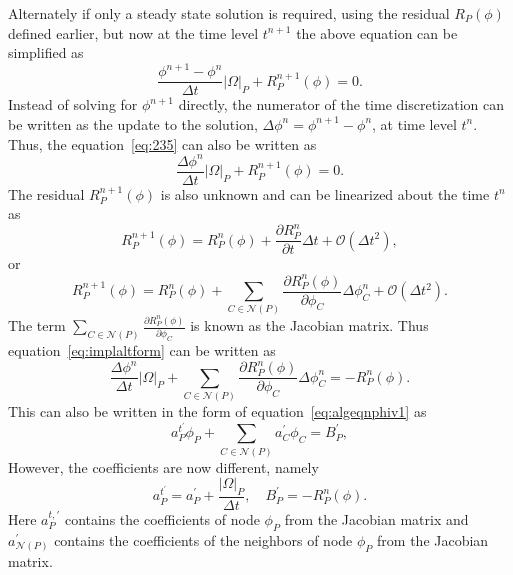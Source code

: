 Alternately if only a steady state solution is required, using the residual $R_P(\phi)$ defined earlier, but now at the time level $t^{n+1}$ the above equation can be simplified as
\begin{equation}
\frac{\phi^{n+1} - \phi^n}{\Delta t} |\Omega|_P + R^{n+1}_P(\phi) = 0.
\label{eq:235}
\end{equation}
Instead of solving for $\phi^{n+1}$ directly, the numerator of the time discretization can be written as the update to the solution, $\Delta \phi^n = \phi^{n+1} - \phi^n$, at time level $t^n$. Thus, the equation~\ref{eq:235} can also be written as 
\begin{equation}
\frac{\Delta \phi^n}{\Delta t} |\Omega|_P + R^{n+1}_P(\phi) = 0.
\label{eq:implaltform}
\end{equation}
The residual $R^{n+1}_P(\phi)$ is also unknown and can be linearized about the time $t^n$ as 
\begin{equation*}
R_P^{n+1}(\phi)  = R_P^n(\phi) + \frac{\partial R_P^n}{\partial t}\Delta t + \mathcal{O}(\Delta t^2),
\end{equation*}
or 
\begin{equation}
R_P^{n+1}(\phi)  = R_P^n(\phi) + \sum_{C\in\mathcal{N}(P)}\frac{\partial R_P^n(\phi)}{\partial \phi_{C}}\Delta \phi^n_{C} + \mathcal{O}(\Delta t^2).
\end{equation}
The term $ \sum_{C\in\mathcal{N}(P)}\frac{\partial R_P^n(\phi)}{\partial \phi_{C}}$ is known as the Jacobian matrix. Thus equation~\ref{eq:implaltform} can be written as
\begin{equation}
\frac{\Delta \phi^n}{\Delta t} |\Omega|_P + \sum_{C\in\mathcal{N}(P)}\frac{\partial R_P^n(\phi)}{\partial \phi_{C}}\Delta \phi^n_{C} = -R_P^n(\phi).
\end{equation}
This can also be written in the form of equation~\ref{eq:algeqnphiv1} as 
\begin{equation}
a_P^{t^\prime} \phi_P + \sum_{C\in\mathcal{N}(P)}a_{C}^{\prime}\phi_{C} = B_P^{\prime},
\label{eq:algeqnphiv2}
\end{equation}
However, the coefficients are now different, namely
\begin{equation}
a_P^{t^\prime} = a_P^{\prime} + \frac{|\Omega|_P}{\Delta t}, \quad B_P^{\prime} = -R_P^n(\phi). 
\end{equation}
Here $a_P^{t,\prime}$ contains the coefficients of node $\phi_P$ from the Jacobian matrix and $a_{\mathcal{N}(P)}^{\prime}$ contains the coefficients of the neighbors of node $\phi_P$ from the Jacobian matrix.

